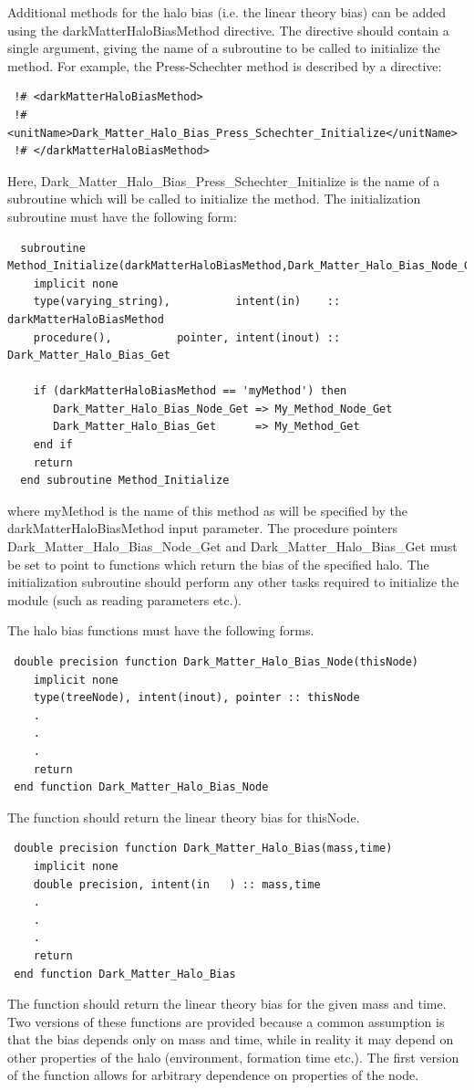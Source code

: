 Additional methods for the halo bias (i.e. the linear theory bias) can be added using the {\normalfont \ttfamily darkMatterHaloBiasMethod} directive. The directive should contain a single argument, giving the name of a subroutine to be called to initialize the method. For example, the {\normalfont \ttfamily Press-Schechter} method is described by a directive:
\begin{verbatim}
 !# <darkMatterHaloBiasMethod>
 !#  <unitName>Dark_Matter_Halo_Bias_Press_Schechter_Initialize</unitName>
 !# </darkMatterHaloBiasMethod>
\end{verbatim}
Here, {\normalfont \ttfamily Dark\_Matter\_Halo\_Bias\_Press\_Schechter\_Initialize} is the name of a subroutine which will be called to initialize the method. The initialization subroutine must have the following form:
\begin{verbatim}
  subroutine Method_Initialize(darkMatterHaloBiasMethod,Dark_Matter_Halo_Bias_Node_Get,Dark_Matter_Halo_Bias_Get)
    implicit none
    type(varying_string),          intent(in)    :: darkMatterHaloBiasMethod
    procedure(),          pointer, intent(inout) :: Dark_Matter_Halo_Bias_Get
    
    if (darkMatterHaloBiasMethod == 'myMethod') then
       Dark_Matter_Halo_Bias_Node_Get => My_Method_Node_Get
       Dark_Matter_Halo_Bias_Get      => My_Method_Get
    end if
    return
  end subroutine Method_Initialize
\end{verbatim}
where {\normalfont \ttfamily myMethod} is the name of this method as will be specified by the {\normalfont \ttfamily darkMatterHaloBiasMethod} input parameter. The procedure pointers {\normalfont \ttfamily Dark\_Matter\_Halo\_Bias\_Node\_Get} and {\normalfont \ttfamily Dark\_Matter\_Halo\_Bias\_Get} must be set to point to functions which return the bias of the specified halo. The initialization subroutine should perform any other tasks required to initialize the module (such as reading parameters etc.).

The halo bias functions must have the following forms.
\begin{verbatim}
 double precision function Dark_Matter_Halo_Bias_Node(thisNode)
    implicit none
    type(treeNode), intent(inout), pointer :: thisNode
    .
    .
    .
    return
 end function Dark_Matter_Halo_Bias_Node
\end{verbatim}
The function should return the linear theory bias for {\normalfont \ttfamily thisNode}.
\begin{verbatim}
 double precision function Dark_Matter_Halo_Bias(mass,time)
    implicit none
    double precision, intent(in   ) :: mass,time
    .
    .
    .
    return
 end function Dark_Matter_Halo_Bias
\end{verbatim}
The function should return the linear theory bias for the given {\normalfont \ttfamily mass} and {\normalfont \ttfamily time}. Two versions of these functions are provided because a common assumption is that the bias depends only on mass and time, while in reality it may depend on other properties of the halo (environment, formation time etc.). The first version of the function allows for arbitrary dependence on properties of the node.

